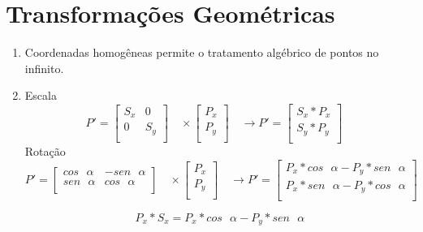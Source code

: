 \section*{Transformações Geométricas}

	\begin{enumerate}[label=\arabic*)]
	    \setlength\itemsep{1em}
	    
		\item Coordenadas homogêneas permite o tratamento algébrico de pontos
	   no infinito.
		
		\item 
	Escala
	\begin{equation*}
	P' = 
	\begin{bmatrix} 
	S_x & 0 \\
	 0   & S_y \\
	\end{bmatrix}
	\quad
	\times
   \begin{bmatrix} 
	P_x  \\
	P_y    \\
	\end{bmatrix}
	\quad
	\rightarrow 
	P' = 
	\begin{bmatrix} 
	S_x  *  P_x \\
	S_y  *  P_y \\
	\end{bmatrix}
	\quad
	\end{equation*}
	Rotação
	\begin{equation*}
	P' = 
	\begin{bmatrix} 
    cos \text{ } \alpha    & - sen \text{ } \alpha \\
	 sen \text{ } \alpha   &  cos \text{ } \alpha  \\
	\end{bmatrix}
	\quad
	\times
   \begin{bmatrix} 
	P_x  \\
	P_y    \\
	\end{bmatrix}
	\quad
	\rightarrow 
	P' = 
	\begin{bmatrix} 
	  P_x * cos \text{ } \alpha - P_y * sen \text{ } \alpha \\
	  P_x * sen \text{ } \alpha - P_y * cos \text{ } \alpha \\
	\end{bmatrix}
	\quad
	\end{equation*}
	
	\begin{equation}
		P_x * S_x = P_x * cos \text{ } \alpha - P_y * sen \text{ } \alpha
	\end{equation}
	

\end{enumerate}
